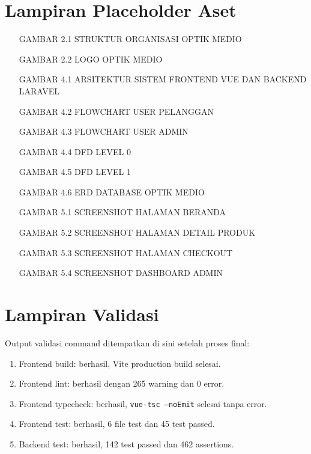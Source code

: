\documentclass[12pt,a4paper]{report}
\begin{document}
\chapter{Lampiran Placeholder Aset}
\begin{enumerate}
    \item [GAMBAR 2.1 STRUKTUR ORGANISASI OPTIK MEDIO]
    \item [GAMBAR 2.2 LOGO OPTIK MEDIO]
    \item [GAMBAR 4.1 ARSITEKTUR SISTEM FRONTEND VUE DAN BACKEND LARAVEL]
    \item [GAMBAR 4.2 FLOWCHART USER PELANGGAN]
    \item [GAMBAR 4.3 FLOWCHART USER ADMIN]
    \item [GAMBAR 4.4 DFD LEVEL 0]
    \item [GAMBAR 4.5 DFD LEVEL 1]
    \item [GAMBAR 4.6 ERD DATABASE OPTIK MEDIO]
    \item [GAMBAR 5.1 SCREENSHOT HALAMAN BERANDA]
    \item [GAMBAR 5.2 SCREENSHOT HALAMAN DETAIL PRODUK]
    \item [GAMBAR 5.3 SCREENSHOT HALAMAN CHECKOUT]
    \item [GAMBAR 5.4 SCREENSHOT DASHBOARD ADMIN]
\end{enumerate}

\chapter{Lampiran Validasi}
Output validasi command ditempatkan di sini setelah proses final:
\begin{enumerate}
    \item Frontend build: berhasil, Vite production build selesai.
    \item Frontend lint: berhasil dengan 265 warning dan 0 error.
    \item Frontend typecheck: berhasil, \texttt{vue-tsc --noEmit} selesai tanpa error.
    \item Frontend test: berhasil, 6 file test dan 45 test passed.
    \item Backend test: berhasil, 142 test passed dan 462 assertions.
\end{enumerate}
\end{document}
